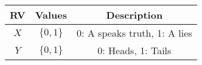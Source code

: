 
\begin{center}
\begin{tabular}{|c|c|c|}
\hline
\textbf{RV}& \textbf{Values} & \textbf{Description} \\ \hline
$X$		   & 	$\{0,1\}$		&   0: A speaks truth, 1: A lies\\ \hline
$Y$ 		   & 	$\{0,1\}$	&	0: Heads, 1: Tails\\ \hline
\end{tabular}
\end{center}

